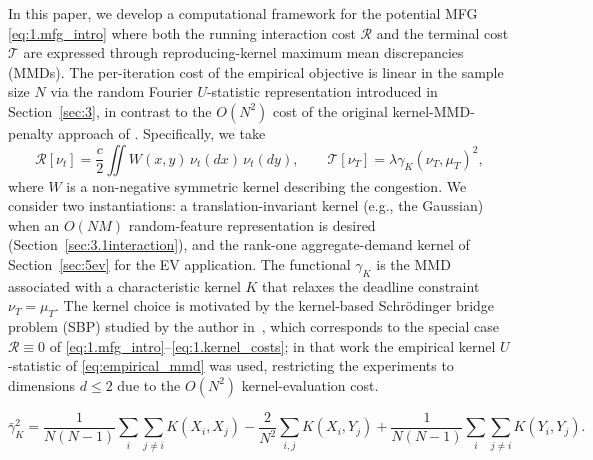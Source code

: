 \documentclass[11pt,leqno]{article}
\theoremstyle{plain}
\theoremstyle{remark}
\theoremstyle{definition}
\numberwithin{equation}{section}
\numberwithin{figure}{section}
\numberwithin{table}{section}
\numberwithin{algorithm}{section}
\begin{document}
In this paper, we develop a computational framework for the potential MFG \eqref{eq:1.mfg_intro}
where both the running interaction cost $\mathcal{R}$ and the terminal cost $\mathcal{T}$ are expressed
through reproducing-kernel maximum mean discrepancies (MMDs).
The per-iteration cost of the empirical objective is linear in the sample size $N$
via the random Fourier $U$-statistic representation introduced in Section~\ref{sec:3},
in contrast to the $O(N^2)$ cost of the original kernel-MMD-penalty approach of \cite{nak:2024sb}.
Specifically, we take
\begin{equation}\label{eq:1.kernel_costs}
 \mathcal{R}[\nu_t] = \frac{c}{2}\iint W(x,y)\,\nu_t(dx)\,\nu_t(dy),
 \qquad
 \mathcal{T}[\nu_T] = \lambda\gamma_K(\nu_T,\mu_T)^2,
\end{equation}
where $W$ is a non-negative symmetric kernel describing the congestion.
We consider two instantiations: a translation-invariant kernel (e.g., the Gaussian)
when an $O(NM)$ random-feature representation is desired (Section~\ref{sec:3.1interaction}),
and the rank-one aggregate-demand kernel of Section~\ref{sec:5ev} for the EV application.
The functional $\gamma_K$ is the MMD associated with a characteristic kernel $K$
that relaxes the deadline constraint $\nu_T=\mu_T$.
The kernel choice is motivated by the kernel-based Schr\"odinger bridge problem (SBP) studied by the author in~\cite{nak:2024sb},
which corresponds to the special case $\mathcal{R}\equiv 0$ of \eqref{eq:1.mfg_intro}--\eqref{eq:1.kernel_costs};
in that work the empirical kernel $U$-statistic of \eqref{eq:empirical_mmd} was used,
restricting the experiments to dimensions $d\le 2$ due to the $O(N^2)$ kernel-evaluation cost.

\begin{equation}
\label{eq:empirical_mmd}
 \bar{\gamma}_K^2 = \frac{1}{N(N-1)}\sum_i\sum_{j\neq i} K(X_i,X_j) - \frac{2}{N^2}\sum_{i,j}K(X_i,Y_j) + \frac{1}{N(N-1)}\sum_i\sum_{j\neq i}K(Y_i,Y_j).
\end{equation}
\end{document}
